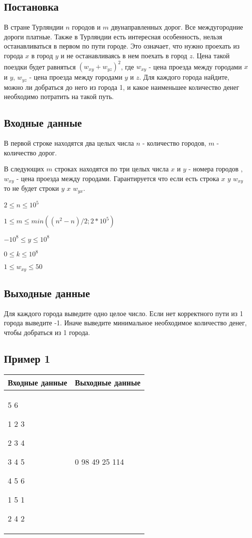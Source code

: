 \documentclass[a4]{article}
\begin{document}
\subsection*{Постановка}
\label{sec:org37954e9}
В стране Турляндии $n$ городов и $m$ двунаправленных дорог. Все междугородние дороги платные. Также в Турляндии есть интересная особенность, нельзя останавливаться в первом по пути городе. Это означает, что нужно проехать из города $x$ в город $y$ и не останавливаясь в нем поехать в город $z$. Цена такой поездки будет равняться $(w_{xy}+w_{yz})^2$, где $w_{xy}$ - цена проезда между городами $x$ и $y$, $w_{yz}$ - цена проезда между городами $y$ и $z$. Для каждого города найдите, можно ли добраться до него из города 1, и какое наименьшее количество денег необходимо потратить на такой путь.
\subsection*{Входные данные}
\label{sec:orgc51833b}
В первой строке находятся два целых числа $n$ - количество городов, $m$ - количество дорог.

В следующих $m$ строках находятся по три целых числа $x$ и $y$ - номера городов , $w_{xy}$ - цена проезда между городами. Гарантируется что если есть строка $x$ $y$ $w_{xy}$ то не будет строки $y$ $x$ $w_{yx}$.

$2\leq n \leq 10^5$

$1 \leq m \leq min((n^2-n)/2;2*10^5)$

$-10^8 \leq y \leq 10^8$

$0\leq k \leq 10^8$

 $1 \leq w_{xy} \leq 50$
\subsection*{Выходные данные}
\label{sec:org91cd1c2}
Для каждого города выведите одно целое число. Если нет корректного пути из 1 города выведите -1. Иначе выведите минимальное необходимое количество денег, чтобы добраться из 1 города.

\subsection*{Пример 1}
\label{sec:org1b720b0}

\begin{table}[H]
\begin{center}
\begin{tabular}{|m{4cm}|m{4cm}|}
\hline
Входные данные & Выходные данные \\ \hline
5 6

1 2 3

2 3 4

3 4 5

4 5 6

1 5 1

2 4 2
&
0 98 49 25 114 
\\ \hline
\end{tabular}
\end{center}
\end{table}
\end{document}
